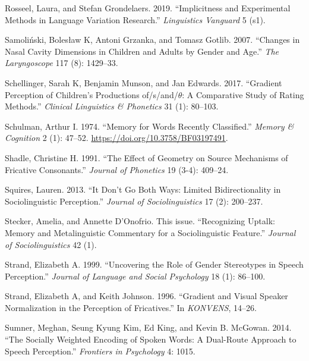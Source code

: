 \documentclass[
  letterpaper,
  DIV=11,
  numbers=noendperiod]{scrartcl}
\newlength{\cslhangindent}
\newenvironment{CSLReferences}[2] %
 {\begin{list}{}{%
  \setlength{\itemindent}{0pt}
  \setlength{\leftmargin}{0pt}
  \setlength{\parsep}{0pt}
  \ifodd #1
   \setlength{\leftmargin}{\cslhangindent}
   \setlength{\itemindent}{-1\cslhangindent}
  \fi
  \setlength{\itemsep}{#2\baselineskip}}}
 {\end{list}}
\begin{document}
\begin{CSLReferences}{1}{0}
Rosseel, Laura, and Stefan Grondelaers. 2019. {``Implicitness and
Experimental Methods in Language Variation Research.''}
\emph{Linguistics Vanguard} 5 (s1).

Samoliński, Bolesław K, Antoni Grzanka, and Tomasz Gotlib. 2007.
{``Changes in Nasal Cavity Dimensions in Children and Adults by Gender
and Age.''} \emph{The Laryngoscope} 117 (8): 1429--33.

Schellinger, Sarah K, Benjamin Munson, and Jan Edwards. 2017.
{``Gradient Perception of Children's Productions of/s/and/\(\theta\): A
Comparative Study of Rating Methods.''} \emph{Clinical Linguistics \&
Phonetics} 31 (1): 80--103.

Schulman, Arthur I. 1974. {``Memory for Words Recently Classified.''}
\emph{Memory \& Cognition} 2 (1): 47--52.
\url{https://doi.org/10.3758/BF03197491}.

Shadle, Christine H. 1991. {``The Effect of Geometry on Source
Mechanisms of Fricative Consonants.''} \emph{Journal of Phonetics} 19
(3-4): 409--24.

Squires, Lauren. 2013. {``It Don't Go Both Ways: Limited
Bidirectionality in Sociolinguistic Perception.''} \emph{Journal of
Sociolinguistics} 17 (2): 200--237.

Stecker, Amelia, and Annette D'Onofrio. This issue. {``Recognizing
Uptalk: Memory and Metalinguistic Commentary for a Sociolinguistic
Feature.''} \emph{Journal of Sociolinguistics} 42 (1).

Strand, Elizabeth A. 1999. {``Uncovering the Role of Gender Stereotypes
in Speech Perception.''} \emph{Journal of Language and Social
Psychology} 18 (1): 86--100.

Strand, Elizabeth A, and Keith Johnson. 1996. {``Gradient and Visual
Speaker Normalization in the Perception of Fricatives.''} In
\emph{KONVENS}, 14--26.

Sumner, Meghan, Seung Kyung Kim, Ed King, and Kevin B. McGowan. 2014.
{``The Socially Weighted Encoding of Spoken Words: A Dual-Route Approach
to Speech Perception.''} \emph{Frontiers in Psychology} 4: 1015.


\end{CSLReferences}
\end{document}

